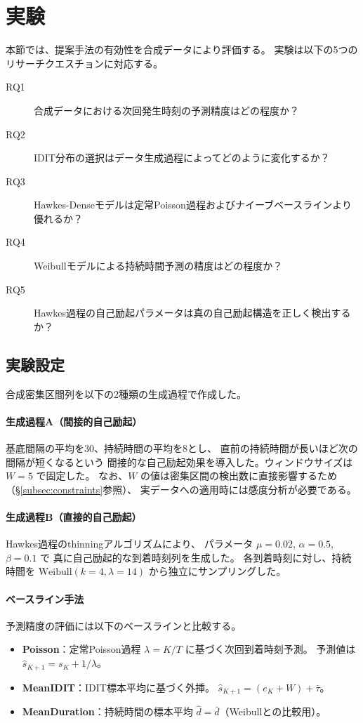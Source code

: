 \section{実験}\label{sec:experiments}

本節では、提案手法の有効性を合成データにより評価する。
実験は以下の5つのリサーチクエスチョンに対応する。

\begin{description}
  \item[RQ1] 合成データにおける次回発生時刻の予測精度はどの程度か？
  \item[RQ2] IDIT分布の選択はデータ生成過程によってどのように変化するか？
  \item[RQ3] Hawkes-Denseモデルは定常Poisson過程およびナイーブベースラインより優れるか？
  \item[RQ4] Weibullモデルによる持続時間予測の精度はどの程度か？
  \item[RQ5] Hawkes過程の自己励起パラメータは真の自己励起構造を正しく検出するか？
\end{description}

\subsection{実験設定}

合成密集区間列を以下の2種類の生成過程で作成した。

\paragraph{生成過程A（間接的自己励起）}
基底間隔の平均を30、持続時間の平均を8とし、
直前の持続時間が長いほど次の間隔が短くなるという
間接的な自己励起効果を導入した。ウィンドウサイズは $W = 5$ で固定した。
なお、$W$ の値は密集区間の検出数に直接影響するため
（\S\ref{subsec:constraints}参照）、
実データへの適用時には感度分析が必要である。

\paragraph{生成過程B（直接的自己励起）}
Hawkes過程のthinningアルゴリズムにより、
パラメータ $\mu = 0.02$, $\alpha = 0.5$, $\beta = 0.1$ で
真に自己励起的な到着時刻列を生成した。
各到着時刻に対し、持続時間を $\mathrm{Weibull}(k=4, \lambda=14)$ から独立にサンプリングした。

\paragraph{ベースライン手法}
予測精度の評価には以下のベースラインと比較する。
\begin{itemize}
  \item \textbf{Poisson}：定常Poisson過程 $\lambda = K/T$ に基づく次回到着時刻予測。
    予測値は $\hat{s}_{K+1} = s_K + 1/\hat{\lambda}$。
  \item \textbf{MeanIDIT}：IDIT標本平均に基づく外挿。
    $\hat{s}_{K+1} = (e_K + W) + \bar{\tau}$。
  \item \textbf{MeanDuration}：持続時間の標本平均 $\hat{d} = \bar{d}$（Weibullとの比較用）。
\end{itemize}

